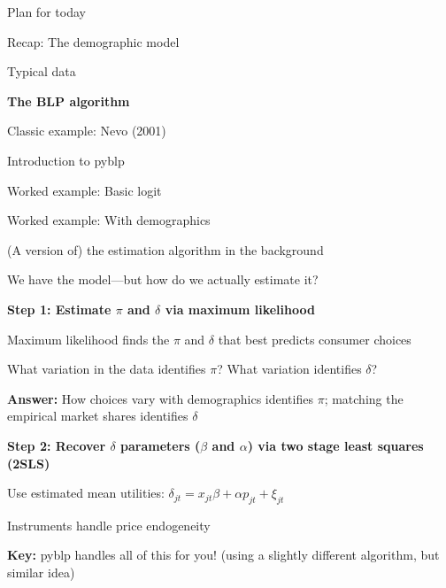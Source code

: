 \documentclass[notes,11pt, aspectratio=169]{beamer}
\newenvironment{wideitemize}{\itemize\addtolength{\itemsep}{10pt}}{\enditemize}
\newenvironment{wideenumerate}{\enumerate\addtolength{\itemsep}{10pt}}{\endenumerate}
\begin{document}

\begin{frame}{Plan for today}
  \begin{wideenumerate}
    \item Recap: The demographic model
    \item Typical data
    \item \textbf{The BLP algorithm}
    \item Classic example: Nevo (2001)
    \item Introduction to pyblp
    \item Worked example: Basic logit
    \item Worked example: With demographics
  \end{wideenumerate}
\end{frame}

\begin{frame}{(A version of) the estimation algorithm in the background}
	\begin{wideitemize}
		\item We have the model---but how do we actually estimate it?
		\item \textbf{Step 1: Estimate $\pi$ and $\delta$ via maximum likelihood}
		\begin{wideitemize}
			\vspace{3pt}
			\item Maximum likelihood finds the $\pi$ and $\delta$ that best predicts consumer choices
			\item What variation in the data identifies $\pi$? What variation identifies $\delta$? \pause
			\item \textbf{Answer:} How choices vary with demographics identifies $\pi$; matching the empirical market shares identifies $\delta$
		\end{wideitemize}
		\item \textbf{Step 2: Recover $\delta$ parameters ($\beta$ and $\alpha$) via two stage least squares (2SLS)}
		\begin{wideitemize}
			\vspace{3pt}
			\item Use estimated mean utilities: $\delta_{jt} = x_{jt} \beta + \alpha p_{jt} + \xi_{jt}$
			\item Instruments handle price endogeneity
		\end{wideitemize}
		\item \textbf{Key:} pyblp handles all of this for you! (using a slightly different algorithm, but similar idea)
	\end{wideitemize}
\end{frame}
\end{document}
